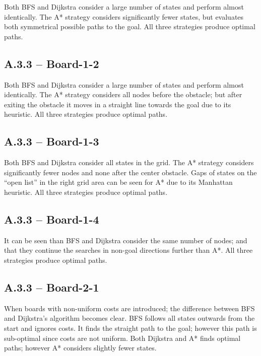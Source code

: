 Both \ac{BFS} and Dijkstra consider a large number of states and perform almost identically. The A* strategy considers significantly fewer states, but evaluates both symmetrical possible paths to the goal. All three strategies produce optimal paths.


\newpage
\subsection*{A.3.3 -- Board-1-2}

Both \ac{BFS} and Dijkstra consider a large number of states and perform almost identically. The A* strategy considers all nodes before the obstacle; but after exiting the obstacle it moves in a straight line towards the goal due to its heuristic. All three strategies produce optimal paths.


\newpage
\subsection*{A.3.3 -- Board-1-3}

Both \ac{BFS} and Dijkstra consider all states in the grid. The A* strategy considers significantly fewer nodes and none after the center obstacle. Gaps of states on the ``open list'' in the right grid area can be seen for A* due to its Manhattan heuristic. All three strategies produce optimal paths.


\newpage
\subsection*{A.3.3 -- Board-1-4}

It can be seen than \ac{BFS} and Dijkstra consider the same number of nodes; and that they continue the searches in non-goal directions further than A*. All three strategies produce optimal paths.


\newpage
\subsection*{A.3.3 -- Board-2-1}

When boards with non-uniform costs are introduced; the difference between \ac{BFS} and Dijkstra's algorithm becomes clear. \ac{BFS} follows all states outwards from the start and ignores costs. It finds the straight path to the goal; however this path is sub-optimal since costs are not uniform. Both Dijkstra and A* finds optimal paths; however A* considers slightly fewer states.

